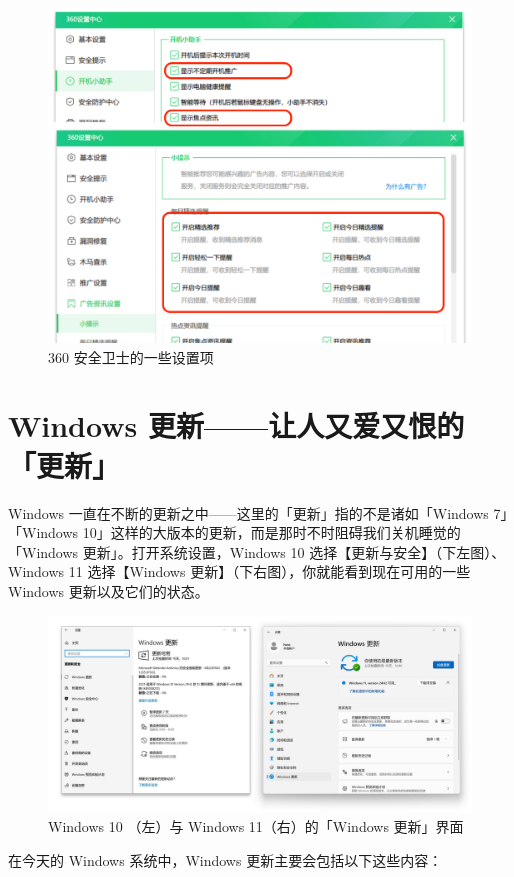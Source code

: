 \begin{figure}[htb!]
  \centering
  \includegraphics[width=.7\textwidth]{assets/basic/Disable_360_ads.png}
  \caption{360 安全卫士的一些设置项}
  \label{fig:Disable_360_ads}
\end{figure}

\section{Windows 更新——让人又爱又恨的「更新」}

Windows 一直在不断的更新之中——这里的「更新」指的不是诸如「Windows 7」「Windows 10」这样的大版本的更新，而是那时不时阻碍我们关机睡觉的「Windows 更新」。打开系统设置，Windows 10 选择【更新与安全】（下左图）、Windows 11 选择【Windows 更新】（下右图），你就能看到现在可用的一些 Windows 更新以及它们的状态。

\begin{figure}[htb!]
  \centering
  \includegraphics[width=.95\textwidth]{assets/basic/Update.png}
  \caption{Windows 10 （左）与 Windows 11（右）的「Windows 更新」界面}
  \label{Windows_Update}
\end{figure}

在今天的 Windows 系统中，Windows 更新主要会包括以下这些内容：


